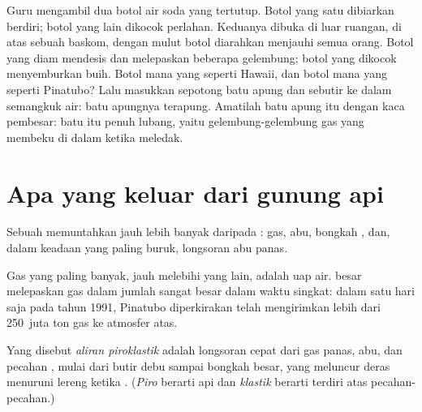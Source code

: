 \begin{inthelab}
Guru mengambil dua botol air soda yang tertutup. Botol yang satu dibiarkan
berdiri; botol yang lain dikocok perlahan. Keduanya dibuka di luar ruangan,
di atas sebuah baskom, dengan mulut botol diarahkan menjauhi semua orang.
Botol yang diam mendesis dan melepaskan beberapa gelembung; botol yang
dikocok menyemburkan buih. Botol mana yang seperti  Hawaii, dan botol
mana yang seperti  Pinatubo? Lalu masukkan sepotong batu apung dan
sebutir  ke dalam semangkuk air: batu apungnya terapung. Amatilah
batu apung itu dengan kaca pembesar: batu itu penuh lubang, yaitu
gelembung-gelembung gas yang membeku di dalam  ketika 
meledak.
\end{inthelab}

\section{Apa yang keluar dari gunung api}

Sebuah  memuntahkan jauh lebih banyak daripada : gas, abu,
bongkah , dan, dalam keadaan yang paling buruk, longsoran abu panas.

Gas yang paling banyak, jauh melebihi yang lain, adalah uap air.
 besar melepaskan gas dalam jumlah sangat besar dalam waktu
singkat: dalam satu hari saja pada tahun 1991, Pinatubo diperkirakan telah
mengirimkan lebih dari 250~juta ton gas ke atmosfer atas.

\begin{definition}\label{def:g7:volcanoes:pyroclastic-flow}
Yang disebut \emph{aliran piroklastik} adalah
longsoran cepat dari gas panas, abu, dan pecahan , mulai dari butir
debu sampai bongkah besar, yang meluncur deras menuruni lereng 
ketika . (\emph{Piro} berarti api dan \emph{klastik} berarti
terdiri atas pecahan-pecahan.)
\end{definition}

